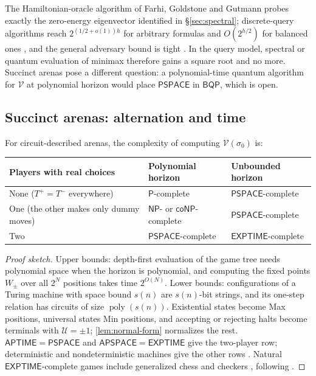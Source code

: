 \documentclass[final]{siamart0516}
\numberwithin{theorem}{section}
\numberwithin{equation}{section}
\theoremstyle{siamnonum}
\theoremstyle{plain}
\newcommand{\val}{\mathcal{V}}            %
\newcommand{\pay}{\mathcal{U}}            %
\newcommand{\poly}{\operatorname{poly}}
\newcommand{\cls}[1]{\mathsf{#1}}
\newcommand{\PSPACE}{\cls{PSPACE}}
\newcommand{\EXPTIME}{\cls{EXPTIME}}
\newcommand{\NP}{\cls{NP}}
\newcommand{\coNP}{\cls{coNP}}
\newcommand{\BQP}{\cls{BQP}}
\newcommand{\Pclass}{\cls{P}}
\begin{document}
The Hamiltonian-oracle algorithm of Farhi, Goldstone and Gutmann \cite{FGG} probes exactly the zero-energy eigenvector identified in \S\ref{sec:spectral}; discrete-query algorithms reach $2^{(1/2+o(1))h}$ for arbitrary formulas \cite{CCJY,ACRSZ} and $O(2^{h/2})$ for balanced ones \cite{ACRSZ}, and the general adversary bound is tight \cite{Reichardt}. In the query model, spectral or quantum evaluation of minimax therefore gains a square root and no more. Succinct arenas pose a different question: a polynomial-time quantum algorithm for $\val$ at polynomial horizon would place $\PSPACE$ in $\BQP$, which is open.

\subsection{Succinct arenas: alternation and time}

\begin{theorem}\label{thm:alternation}
For circuit-described arenas, the complexity of computing $\val(\sigma_0)$ is:
\begin{center}\small
\begin{tabularx}{\linewidth}{@{}>{\raggedright\arraybackslash}Xll@{}}
\toprule
Players with real choices & Polynomial horizon & Unbounded horizon\\ \midrule
None ($T^{+}=T^{-}$ everywhere) & $\Pclass$-complete & $\PSPACE$-complete\\
One (the other makes only dummy moves) & $\NP$- or $\coNP$-complete & $\PSPACE$-complete\\
Two & $\PSPACE$-complete & $\EXPTIME$-complete\\
\bottomrule
\end{tabularx}
\end{center}
\end{theorem}

\begin{proof}[Proof sketch]
Upper bounds: depth-first evaluation of the game tree needs polynomial space when the horizon is polynomial, and computing the fixed points $W_{\pm}$ over all $2^N$ positions takes time $2^{O(N)}$. Lower bounds: configurations of a Turing machine with space bound $s(n)$ are $s(n)$-bit strings, and its one-step relation has circuits of size $\poly(s(n))$. Existential states become Max positions, universal states Min positions, and accepting or rejecting halts become terminals with $\pay=\pm1$; \cref{lem:normal-form} normalizes the rest. $\mathsf{APTIME}=\PSPACE$ and $\mathsf{APSPACE}=\EXPTIME$ \cite{CKS} give the two-player row; deterministic and nondeterministic machines give the other rows \cite{HearnDemaine}. Natural $\EXPTIME$-complete games include generalized chess \cite{FraenkelLichtenstein} and checkers \cite{Robson}, following \cite{StockmeyerChandra}.
\end{proof}
\end{document}
